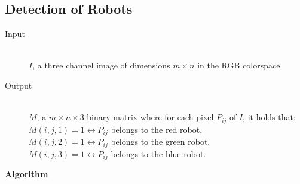 \documentclass[10pt,a4paper]{article}
\begin{document}
\subsection{Detection of Robots}\label{coloralgo}
\begin{description}
\item[Input] \hfill \\
    $I$, a three channel image of dimensions $m \times n$ in the RGB colorspace.
\item[Output] \hfill \\
    $M$, a $m \times n \times 3$ binary matrix where for each pixel $P_{ij}$ of
    $I$, it holds that: \\
    $M(i,j,1) = 1 \leftrightarrow P_{ij}$ belongs to the red robot, \\
    $M(i,j,2) = 1 \leftrightarrow P_{ij}$ belongs to the green robot, \\
    $M(i,j,3) = 1 \leftrightarrow P_{ij}$ belongs to the blue robot.
\end{description}
\textbf{Algorithm}
\end{document}
